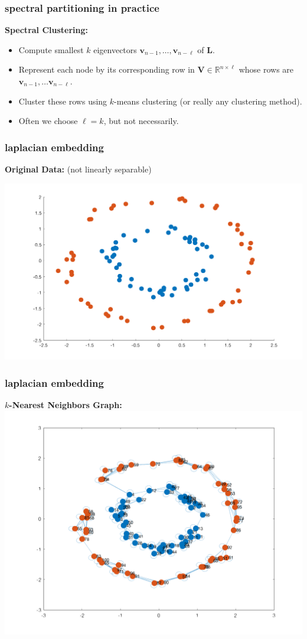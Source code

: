 \documentclass[compress]{beamer}
\newcommand{\bv}[1]{\mathbf{#1}}
\newcommand{\R}{\mathbb{R}}
\begin{document}
\begin{frame}
	\frametitle{spectral partitioning in practice}
	\textbf{Spectral Clustering:}
	\begin{itemize}
		\item Compute smallest $k$ eigenvectors $\bv{v}_{n-1}, \ldots, \bv{v}_{n-\ell}$ of $\mathbf{L}$.
		\item Represent each node by its corresponding row in $\bv{V} \in \R^{n \times \ell}$ whose rows are  $\bv{v}_{n-1}, \ldots \bv{v}_{n-\ell}$.
		\item Cluster these rows using $k$-means clustering (or really any clustering method).
		\item Often we choose $\ell = k$, but not necessarily. 
	\end{itemize}
\end{frame}

\begin{frame}
	\frametitle{laplacian embedding}
	\begin{center}
		\textbf{Original Data:} (not linearly separable)
			
			\includegraphics[width=.7\textwidth]{circ.png}
	\end{center}
\end{frame}

\begin{frame}
	\frametitle{laplacian embedding}
	\begin{center}
			\textbf{$k$-Nearest Neighbors Graph:}
			\includegraphics[width=.7\textwidth]{circ2.png}
	\end{center}
\end{frame}
\end{document}
